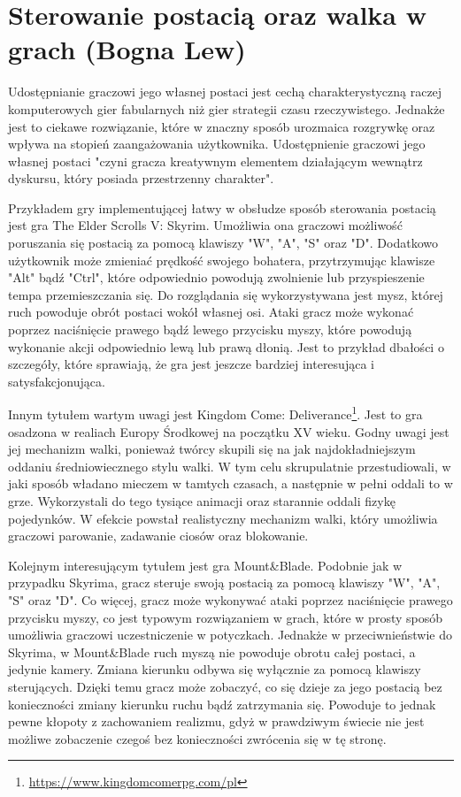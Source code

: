 \section{Sterowanie postacią oraz walka w grach (Bogna Lew)}\label{s:walka}
Udostępnianie graczowi jego własnej postaci jest cechą charakterystyczną raczej komputerowych gier fabularnych niż gier
strategii czasu rzeczywistego. Jednakże jest to ciekawe rozwiązanie, które w znaczny sposób urozmaica rozgrywkę oraz
wpływa na stopień zaangażowania użytkownika. Udostępnienie graczowi jego własnej postaci "czyni gracza kreatywnym
elementem działającym wewnątrz dyskursu, który posiada przestrzenny charakter"\cite{olbrzymwcieniu}.

Przykładem gry implementującej łatwy w obsłudze sposób sterowania postacią jest gra The Elder Scrolls V: Skyrim. Umożliwia
ona graczowi możliwość poruszania się postacią za pomocą klawiszy "W", "A", "S" oraz "D". Dodatkowo użytkownik może
zmieniać prędkość swojego bohatera, przytrzymując klawisze "Alt" bądź "Ctrl", które odpowiednio powodują zwolnienie lub
przyspieszenie tempa przemieszczania się. Do rozglądania się wykorzystywana jest mysz, której ruch powoduje obrót postaci
wokół własnej osi. Ataki gracz może wykonać poprzez naciśnięcie prawego bądź lewego przycisku myszy, które powodują
wykonanie akcji odpowiednio lewą lub prawą dłonią. Jest to przykład dbałości o szczegóły, które sprawiają, że gra
jest jeszcze bardziej interesująca i satysfakcjonująca.

Innym tytułem wartym uwagi jest Kingdom Come: Deliverance\footnote{\url{https://www.kingdomcomerpg.com/pl}}. Jest to gra osadzona w realiach Europy Środkowej na początku
XV wieku. Godny uwagi jest jej mechanizm walki, ponieważ twórcy skupili się na jak najdokładniejszym oddaniu średniowiecznego
stylu walki. W tym celu skrupulatnie przestudiowali, w jaki sposób władano mieczem w tamtych czasach, a następnie w
pełni oddali to w grze. Wykorzystali do tego tysiące animacji oraz starannie oddali fizykę pojedynków. W efekcie powstał
realistyczny mechanizm walki, który umożliwia graczowi parowanie, zadawanie ciosów oraz blokowanie.

Kolejnym interesującym tytułem jest gra Mount\&Blade. Podobnie jak w przypadku Skyrima, gracz steruje swoją postacią za
pomocą klawiszy  "W", "A", "S" oraz "D". Co więcej, gracz może wykonywać ataki poprzez naciśnięcie prawego przycisku myszy, co jest typowym rozwiązaniem w grach,
które w prosty sposób umożliwia graczowi uczestniczenie w potyczkach. Jednakże w przeciwnieństwie do Skyrima, w Mount\&Blade ruch myszą nie powoduje obrotu całej postaci,
a jedynie kamery. Zmiana kierunku odbywa się wyłącznie za pomocą klawiszy sterujących. Dzięki temu gracz może zobaczyć, co
się dzieje za jego postacią bez konieczności zmiany kierunku ruchu bądź zatrzymania się. Powoduje to jednak pewne kłopoty z zachowaniem
realizmu, gdyż w prawdziwym świecie nie jest możliwe zobaczenie czegoś bez konieczności zwrócenia się w tę stronę.


